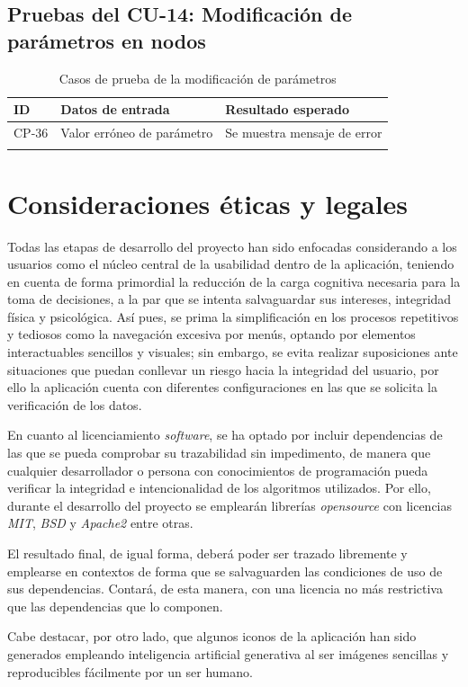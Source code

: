 \newpage
\subsection{Pruebas del CU-14: Modificación de parámetros en nodos}
\begin{longtable}{|p{1.5cm}|p{4cm}|p{4cm}|}
\hline
\textbf{ID} & \textbf{Datos de entrada} & \textbf{Resultado esperado} \\
\hline
CP-36 & Valor erróneo de parámetro & Se muestra mensaje de error \\
\hline
\caption{Casos de prueba de la modificación de parámetros}
\end{longtable}

\section{Consideraciones éticas y legales}
Todas las etapas de desarrollo del proyecto han sido enfocadas considerando a los usuarios como el núcleo central de la usabilidad dentro de la aplicación, 
teniendo en cuenta de forma primordial la reducción de la carga cognitiva necesaria para la toma de decisiones, a la par que se intenta salvaguardar sus 
intereses, integridad física y psicológica. Así pues, se prima la simplificación en los procesos repetitivos y tediosos como la navegación excesiva por menús, optando 
por elementos interactuables sencillos y visuales; sin embargo, se evita realizar suposiciones ante situaciones que puedan conllevar un riesgo hacia la integridad 
del usuario, por ello la aplicación cuenta con diferentes configuraciones en las que se solicita la verificación de los datos.

En cuanto al licenciamiento \textit{software}, se ha optado por incluir dependencias de las que se pueda comprobar su trazabilidad sin impedimento, de manera que 
cualquier desarrollador o persona con conocimientos de programación pueda verificar la integridad e intencionalidad de los algoritmos utilizados. Por ello, durante
el desarrollo del proyecto se emplearán librerías \textit{opensource} con licencias \textit{MIT}, \textit{BSD} y \textit{Apache2} entre otras.

El resultado final, de igual forma, deberá poder ser trazado libremente y emplearse en contextos de forma que se salvaguarden las condiciones de uso de sus dependencias. 
Contará, de esta manera, con una licencia no más restrictiva que las dependencias que lo componen.

Cabe destacar, por otro lado, que algunos iconos de la aplicación han sido generados empleando inteligencia artificial generativa al ser imágenes sencillas y reproducibles 
fácilmente por un ser humano.